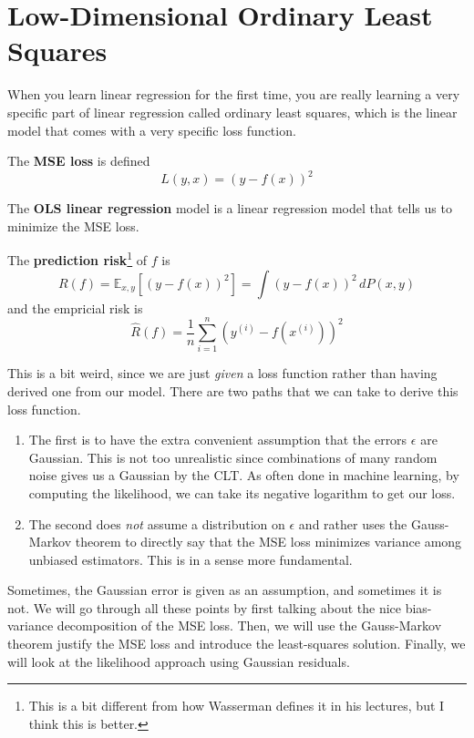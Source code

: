 \section{Low-Dimensional Ordinary Least Squares}

  When you learn linear regression for the first time, you are really learning a very specific part of linear regression called ordinary least squares, which is the linear model that comes with a very specific loss function. 

  \begin{definition}
    The \textbf{MSE loss} is defined 
    \begin{equation}
      L(y, x) = (y - f(x))^2
    \end{equation}
  \end{definition}

  \begin{definition}
    The \textbf{OLS linear regression} model is a linear regression model that tells us to minimize the MSE loss. 
  \end{definition}

  \begin{theorem}
    The \textbf{prediction risk}\footnote{This is a bit different from how Wasserman defines it in his lectures, but I think this is better.} of $f$ is 
    \begin{equation}
      R(f) = \mathbb{E}_{x, y} [ (y - f(x))^2 ] = \int (y - f(x))^2 \,dP(x, y)
    \end{equation}
    and the empricial risk is 
    \begin{equation}
      \hat{R}(f) = \frac{1}{n} \sum_{i=1}^n (y^{(i)} - f(x^{(i)}))^2 
    \end{equation}
  \end{theorem}

  This is a bit weird, since we are just \textit{given} a loss function rather than having derived one from our model. There are two paths that we can take to derive this loss function. 
  \begin{enumerate}
    \item The first is to have the extra convenient assumption that the errors $\epsilon$ are Gaussian. This is not too unrealistic since combinations of many random noise gives us a Gaussian by the CLT. As often done in machine learning, by computing the likelihood, we can take its negative logarithm to get our loss. 
    \item The second does \textit{not} assume a distribution on $\epsilon$ and rather uses the Gauss-Markov theorem to directly say that the MSE loss minimizes variance among unbiased estimators. This is in a sense more fundamental. 
  \end{enumerate}
  Sometimes, the Gaussian error is given as an assumption, and sometimes it is not. We will go through all these points by first talking about the nice bias-variance decomposition of the MSE loss. Then, we will use the Gauss-Markov theorem justify the MSE loss and introduce the least-squares solution. Finally, we will look at the likelihood approach using Gaussian residuals. 

